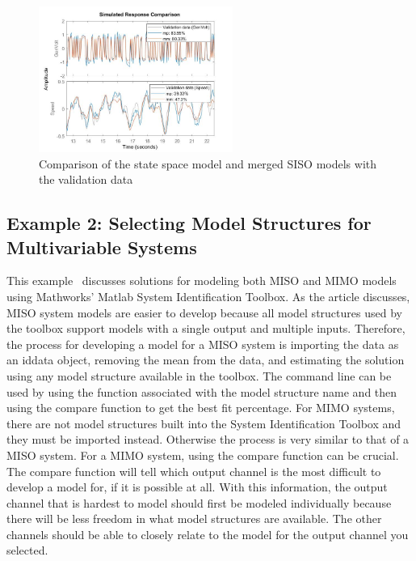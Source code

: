 \documentclass[journal,twoside,web]{ieeecolor}
\begin{document}
\begin{figure}[htbp]
    \centering
    \includegraphics[width=2.5in]{figs/img/mimoExGrady}
    \caption{Comparison of the state space model and merged SISO models with the validation data}
    \label{fig:exMIMO}
\end{figure}

\subsection{Example 2: Selecting Model Structures for Multivariable Systems}
\label{sec:sysID-Example2}
This example~\cite{Matlab2} discusses solutions for modeling both MISO and MIMO models using Mathworks' Matlab System Identification Toolbox. As the article discusses, MISO system models are easier to develop because all model structures used by the toolbox support models with a single output and multiple inputs. Therefore, the process for developing a model for a MISO system is importing the data as an iddata object, removing the mean from the data, and estimating the solution using any model structure available in the toolbox. The command line can be used by using the function associated with the model structure name and then using the compare function to get the best fit percentage. For MIMO systems, there are not model structures built into the System Identification Toolbox and they must be imported instead. Otherwise the process is very similar to that of a MISO system. For a MIMO system, using the compare function can be crucial. The compare function will tell which output channel is the most difficult to develop a model for, if it is possible at all. With this information, the output channel that is hardest to model should first be modeled individually because there will be less freedom in what model structures are available. The other channels should be able to closely relate to the model for the output channel you selected.
\end{document}
